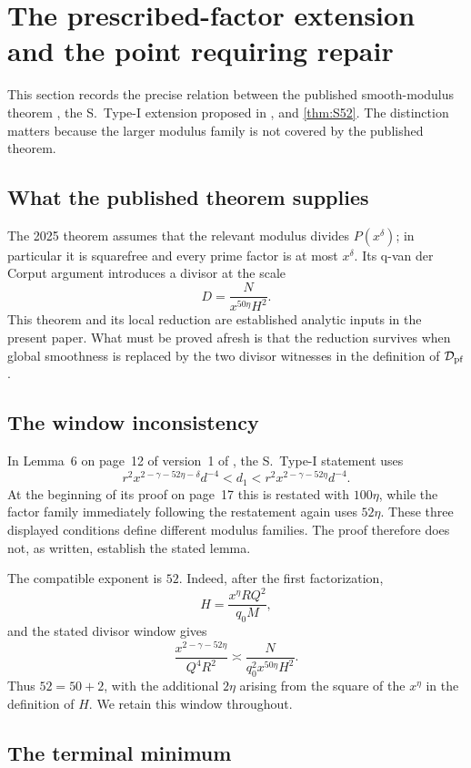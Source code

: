 \section{The prescribed-factor extension and the point requiring repair}
\label{sec:diagnosis}

This section records the precise relation between the published
smooth-modulus theorem \cite{Stadlmann2025}, the S.~Type-I extension proposed
in \cite{Stadlmann2026}, and \cref{thm:S52}.  The distinction matters
because the larger modulus family is not covered by the published theorem.

\subsection{What the published theorem supplies}

The 2025 theorem assumes that the relevant modulus divides $P(x^\delta)$;
in particular it is squarefree and every prime factor is at most $x^\delta$.
Its q-van der Corput argument introduces a divisor at the scale
\[
 D=\frac{N}{x^{50\eta}H^2}.
\]
This theorem and its local reduction are established analytic inputs in the
present paper.  What must be proved afresh is that the reduction survives when
global smoothness is replaced by the two divisor witnesses in the definition
of $\mathcal D_{\mathrm{pf}}$.

\subsection{The window inconsistency}

In Lemma~6 on page~12 of version~1 of \cite{Stadlmann2026}, the
S.~Type-I statement uses
\[
 r^2x^{2-\gamma-52\eta-\delta}d^{-4}<d_1<
 r^2x^{2-\gamma-52\eta}d^{-4}.
\]
At the beginning of its proof on page~17 this is restated with $100\eta$,
while the factor family immediately following the restatement again uses
$52\eta$.
These three displayed conditions define different modulus families.  The
proof therefore does not, as written, establish the stated lemma.

The compatible exponent is $52$.  Indeed, after the first factorization,
\[
 H=\frac{x^\eta RQ^2}{q_0M},
\]
and the stated divisor window gives
\[
 \frac{x^{2-\gamma-52\eta}}{Q^4R^2}
 \asymp \frac{N}{q_0^2x^{50\eta}H^2}.
\]
Thus $52=50+2$, with the additional $2\eta$ arising from the square of the
$x^\eta$ in the definition of $H$.  We retain this window throughout.

\subsection{The terminal minimum}

